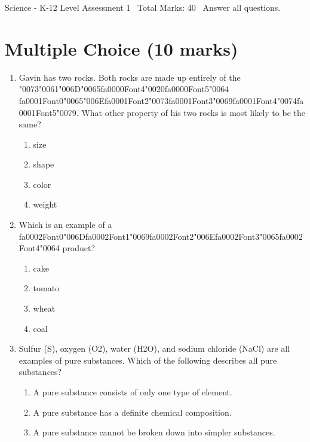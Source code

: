 \documentclass[12pt]{article}
\begin{document}
\begin{center}
Science - K-12 Level Assessment 1 \
Total Marks: 40 \
Answer all questions.
\end{center}

\section*{Multiple Choice (10 marks)}
\begin{enumerate}[label=\arabic*.]
\item Gavin has two rocks. Both rocks are made up entirely of the {\char"0073}{\char"0061}{\char"006D}{\char"0065}{\csname fa0000Font4\endcsname\char"0020}{\csname fa0000Font5\endcsname\char"0064} {\csname fa0001Font0\endcsname\char"0065}{\char"006E}{\csname fa0001Font2\endcsname\char"0073}{\csname fa0001Font3\endcsname\char"0069}{\csname fa0001Font4\endcsname\char"0074}{\csname fa0001Font5\endcsname\char"0079}. What other
property of his two rocks is most likely to be the same?
\begin{enumerate}[label=(\alph*)]
    \item size
    \item shape
    \item color
    \item weight
\end{enumerate}
\item Which is an example of a {\csname fa0002Font0\endcsname\char"006D}{\csname fa0002Font1\endcsname\char"0069}{\csname fa0002Font2\endcsname\char"006E}{\csname fa0002Font3\endcsname\char"0065}{\csname fa0002Font4\endcsname\char"0064} product?
\begin{enumerate}[label=(\alph*)]
    \item cake
    \item tomato
    \item wheat
    \item coal
\end{enumerate}
\item Sulfur (S), oxygen (O2), water (H2O), and sodium chloride (NaCl) are all examples of pure
substances. Which of the following describes all pure substances?
\begin{enumerate}[label=(\alph*)]
    \item A pure substance consists of only one type of element.
    \item A pure substance has a definite chemical composition.
    \item A pure substance cannot be broken down into simpler substances.

\end{enumerate}
\end{enumerate}
\end{document}
